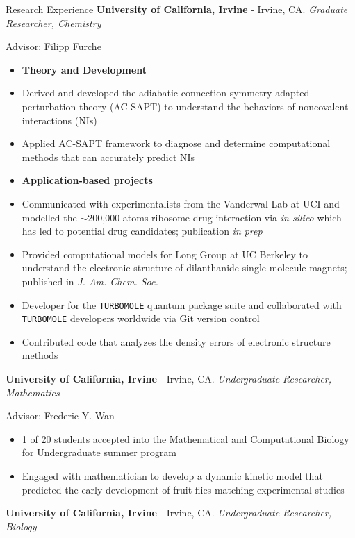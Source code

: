 \begin{rubric}{Research Experience}
  \textbf{University of California, Irvine} - Irvine, CA.
  \textit{Graduate Researcher, Chemistry}
  
  Advisor: Filipp Furche
  \vspace{-0.5em}
  \begin{itemize}
    \itemsep-0.5em
  \item[] \hspace{-0.33in}\textbf{Theory and Development}
  \item Derived and developed the adiabatic connection symmetry adapted perturbation theory
    (AC-SAPT) to understand the behaviors of noncovalent interactions (NIs)
  \item Applied AC-SAPT framework to diagnose and determine computational methods that can accurately
    predict NIs
  \item[] \hspace{-0.33in}\textbf{Application-based projects}
  \item Communicated with experimentalists from the Vanderwal Lab at UCI and modelled
    the $\sim$200,000 atoms ribosome-drug interaction via \textit{in silico} which has led to
    potential drug candidates; publication \textit{in prep}
  \item Provided computational models for Long Group at UC Berkeley to understand the
    electronic structure of dilanthanide single molecule magnets; published in \textit{J. Am. Chem. Soc.}
  \item Developer for the \texttt{TURBOMOLE} quantum package suite and collaborated with \texttt{TURBOMOLE}
    developers worldwide via Git version control
  \item Contributed code that analyzes the density errors of electronic structure methods
  \end{itemize}
  \textbf{University of California, Irvine} - Irvine, CA.
  \textit{Undergraduate Researcher, Mathematics}

  Advisor: Frederic Y. Wan
  \vspace{-0.5em}
  \begin{itemize}
  \itemsep-0.5em
  \item 1 of 20 students accepted into the Mathematical and Computational Biology for Undergraduate
    summer program
  \item Engaged with mathematician to develop a dynamic kinetic model that predicted the early
    development of fruit flies matching experimental studies
  \end{itemize}
  \textbf{University of California, Irvine} - Irvine, CA.
  \textit{Undergraduate Researcher, Biology}


\end{rubric}
